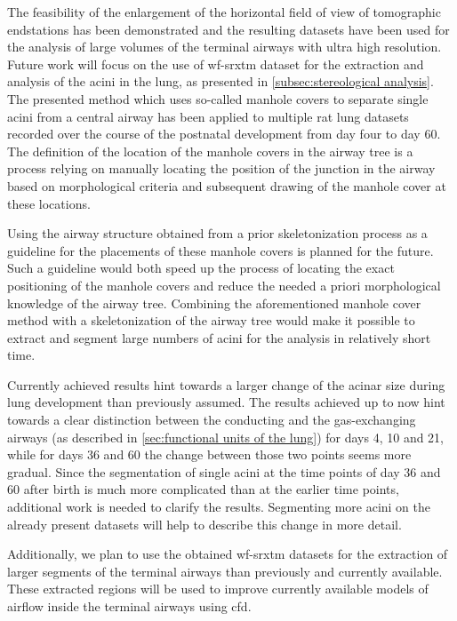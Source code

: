 The feasibility of the enlargement of the horizontal field of view of tomographic endstations has been demonstrated and the resulting datasets have been used for the analysis of large volumes of the terminal airways with ultra high resolution. Future work will focus on the use of \ac{wf-srxtm} dataset for the extraction and analysis of the acini in the lung, as presented in \autoref{subsec:stereological analysis}. The presented method which uses so-called manhole covers to separate single acini from a central airway has been applied to multiple rat lung datasets recorded over the course of the postnatal development from day four to day 60. The definition of the location of the manhole covers in the airway tree is a process relying on manually locating the position of the junction in the airway based on morphological criteria and subsequent drawing of the manhole cover at these locations.

Using the airway structure obtained from a prior skeletonization process as a guideline for the placements of these manhole covers is planned for the future. Such a guideline would both speed up the process of locating the exact positioning of the manhole covers and reduce the needed a priori morphological knowledge of the airway tree. Combining the aforementioned manhole cover method with a skeletonization of the airway tree would make it possible to extract and segment large numbers of acini for the analysis in relatively short time.

Currently achieved results hint towards a larger change of the acinar size during lung development than previously assumed. The results achieved up to now hint towards a clear distinction between the conducting and the gas-exchanging airways (as described in \autoref{sec:functional units of the lung}) for days 4, 10 and 21, while for days 36 and 60 the change between those two points seems more gradual. Since the segmentation of single acini at the time points of day 36 and 60 after birth is much more complicated than at the earlier time points, additional work is needed to clarify the results. Segmenting more acini on the already present datasets will help to describe this change in more detail. 

Additionally, we plan to use the obtained \ac{wf-srxtm} datasets for the extraction of larger segments of the terminal airways than previously and currently available. These extracted regions will be used to improve currently available models of airflow inside the terminal airways \cite{Sznitman2007,Sznitman2009} using \ac{cfd}. 

